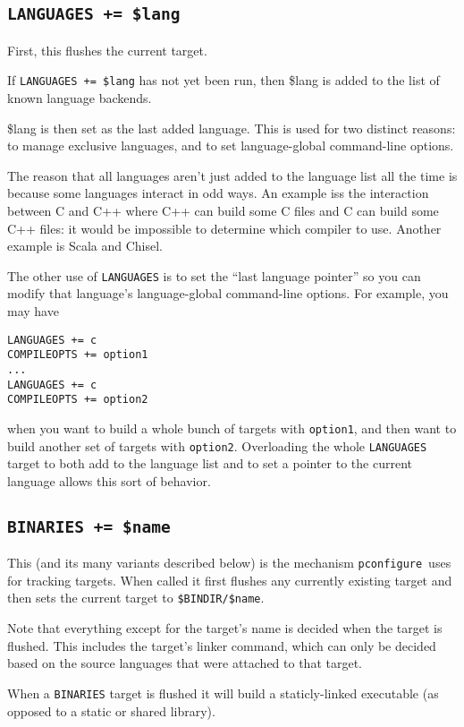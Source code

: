 \documentclass{article}
\newcommand{\pconfigure}{\texttt{pconfigure}}
\begin{document}
\subsection{\texttt{LANGUAGES += \$lang}}

First, this flushes the current target.

If \texttt{LANGUAGES += \$lang} has not yet been run, then \$lang is
added to the list of known language backends.

\$lang is then set as the last added language.  This is used for two
distinct reasons: to manage exclusive languages, and to set
language-global command-line options.

The reason that all languages aren't just added to the language list
all the time is because some languages interact in odd ways.  An
example iss the interaction between C and C++ where C++ can build some
C files and C can build some C++ files: it would be impossible to
determine which compiler to use.  Another example is Scala and Chisel.

The other use of \texttt{LANGUAGES} is to set the ``last language
pointer'' so you can modify that language's language-global
command-line options.  For example, you may have
\begin{verbatim}
LANGUAGES += c
COMPILEOPTS += option1
...
LANGUAGES += c
COMPILEOPTS += option2
\end{verbatim}
when you want to build a whole bunch of targets with \texttt{option1},
and then want to build another set of targets with \texttt{option2}.
Overloading the whole \texttt{LANGUAGES} target to both add to the
language list and to set a pointer to the current language allows this
sort of behavior.

\subsection{\texttt{BINARIES += \$name} \label{cmd:binaries}}

This (and its many variants described below) is the mechanism
\pconfigure\ uses for tracking targets.  When called it first flushes
any currently existing target and then sets the current target to
\texttt{\$BINDIR/\$name}.

Note that everything except for the target's name is decided when the
target is flushed.  This includes the target's linker command, which
can only be decided based on the source languages that were attached
to that target.

When a \texttt{BINARIES} target is flushed it will build a
staticly-linked executable (as opposed to a static or shared library).
\end{document}
